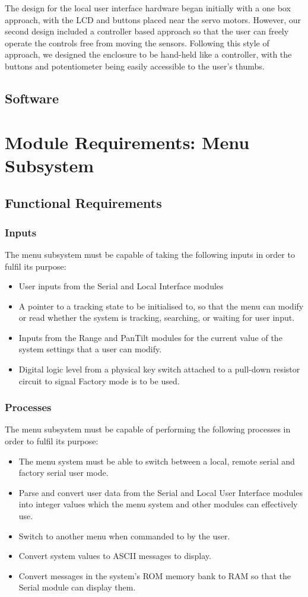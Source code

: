 \documentclass[]{report}
\begin{document}
The design for the local user interface hardware began initially with a one box approach, with the LCD and buttons placed near the servo motors. However, our second design included a controller based approach so that the user can freely operate the controls free from moving the sensors. Following this style of approach, we designed the enclosure to be hand-held like a controller, with the buttons and potentiometer being easily accessible to the user's thumbs. 
\subsection{Software}


\section{Module Requirements: Menu Subsystem}
\subsection{Functional Requirements}
\subsubsection{Inputs}
The menu subsystem must be capable of taking the following inputs in order to fulfil its purpose:
\begin{itemize}
	\item User inputs from the Serial and Local Interface modules
	\item A pointer to a tracking state to be initialised to, so that the menu can modify or read whether the system is tracking, searching, or waiting for user input.
	\item Inputs from the Range and PanTilt modules for the current value of the system settings that a user can modify.
	\item Digital logic level from a physical key switch attached to a pull-down resistor circuit to signal Factory mode is to be used.
\end{itemize}

\subsubsection{Processes}
The menu subsystem must be capable of performing the following processes in order to fulfil its purpose:
\begin{itemize}
	\item The menu system must be able to switch between a local, remote serial and factory serial user mode.
	\item Parse and convert user data from the Serial and Local User Interface modules into integer values which the menu system and other modules can effectively use.
	\item Switch to another menu when commanded to by the user.
	\item Convert system values to ASCII messages to display.
	\item Convert messages in the system's ROM memory bank to RAM so that the Serial module can display them.
\end{itemize}
\end{document}
